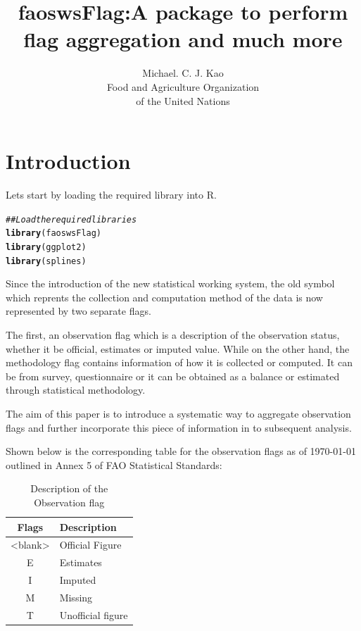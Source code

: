 \documentclass[nojss]{jss}\usepackage[]{graphicx}\usepackage[]{color}
\title{\bf faoswsFlag:A package to perform \\flag aggregation and much
  more}
\author{Michael. C. J. Kao\\ Food and Agriculture Organization \\ of
  the United Nations}
\makeatletter
\newcommand{\hlcom}[1]{\textcolor[rgb]{0.678,0.584,0.686}{\textit{#1}}}%
\newcommand{\hlstd}[1]{\textcolor[rgb]{0.345,0.345,0.345}{#1}}%
\newcommand{\hlkwd}[1]{\textcolor[rgb]{0.737,0.353,0.396}{\textbf{#1}}}%
\newenvironment{kframe}{%
 \def\at@end@of@kframe{}%
 \ifinner\ifhmode%
  \def\at@end@of@kframe{\end{minipage}}%
  \begin{minipage}{\columnwidth}%
 \fi\fi%
 \def\FrameCommand##1{\hskip\@totalleftmargin \hskip-\fboxsep
 \colorbox{shadecolor}{##1}\hskip-\fboxsep
     \hskip-\linewidth \hskip-\@totalleftmargin \hskip\columnwidth}%
 \MakeFramed {\advance\hsize-\width
   \@totalleftmargin\z@ \linewidth\hsize
   \@setminipage}}%
 {\par\unskip\endMakeFramed%
 \at@end@of@kframe}
\newenvironment{knitrout}{}{} %
\makeatother
\begin{document}
\section{Introduction}
Lets start by loading the required library into R.

\begin{knitrout}
\color{fgcolor}\begin{kframe}
\begin{alltt}
\hlcom{## Load the required libraries}
\hlkwd{library}\hlstd{(faoswsFlag)}
\hlkwd{library}\hlstd{(ggplot2)}
\hlkwd{library}\hlstd{(splines)}
\end{alltt}
\end{kframe}
\end{knitrout}

Since the introduction of the new statistical working system, the old
symbol which reprents the collection and computation method of the
data is now represented by two separate flags.

The first, an observation flag which is a description of the
observation status, whether it be official, estimates or imputed
value. While on the other hand, the methodology flag contains
information of how it is collected or computed. It can be from survey,
questionnaire or it can be obtained as a balance or estimated through
statistical methodology.

The aim of this paper is to introduce a systematic way to aggregate
observation flags and further incorporate this piece of information in
to subsequent analysis.

Shown below is the corresponding table for the observation flags as of
\today{} outlined in Annex 5 of FAO Statistical Standards:

\begin{table}[h!]
  \begin{center}
    \caption{Description of the Observation flag}
    \begin{tabular}{|c|p{12cm}|}
      \hline
      Flags & Description\\
      \hline
      <blank> & Official Figure\\
      E & Estimates\\
      I & Imputed\\
      M & Missing\\
      T & Unofficial figure\\
      \hline
    \end{tabular}
  \end{center}  
\end{table}
\end{document}
